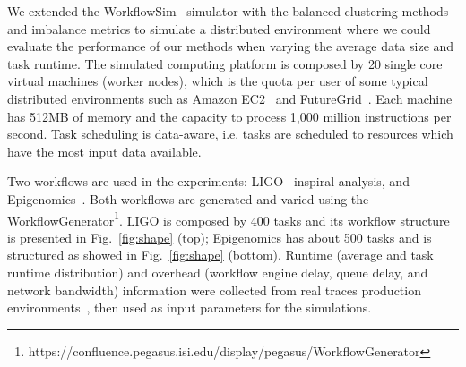 \documentclass[final]{IEEEtran}
\begin{document}
We extended the WorkflowSim~\cite{WorkflowSim} simulator with the balanced clustering methods and imbalance metrics to simulate a distributed environment where we could evaluate the performance of our methods when varying the average data size and task runtime. The simulated computing platform is composed by 20 single core virtual machines (worker nodes), which is the quota per user of some typical distributed environments such as Amazon EC2~\cite{AmazonAWS} and FutureGrid~\cite{FutureGrid}. Each machine has 512MB of memory and the capacity to process 1,000 million instructions per second. Task scheduling is data-aware, i.e. tasks are scheduled to resources which have the most input data available.

Two workflows are used in the experiments: LIGO~\cite{LIGO} inspiral analysis, and Epigenomics~\cite{Epigenome}. 
Both workflows are generated and varied using the WorkflowGenerator\footnote[1]{https://confluence.pegasus.isi.edu/display/pegasus/WorkflowGenerator}. LIGO is composed by 400 tasks and its workflow structure is presented in Fig.~\ref{fig:shape} (top); Epigenomics has about 500 tasks and is structured as showed in Fig.~\ref{fig:shape} (bottom). Runtime (average and task runtime distribution) and overhead (workflow engine delay, queue delay, and network bandwidth) information were collected from real traces production environments~\cite{Chen, Juve2013}, then used as input parameters for the simulations.

\end{document}
